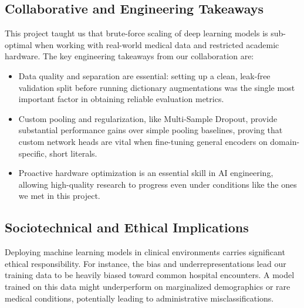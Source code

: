 \documentclass{article}
\begin{document}
\subsection{Collaborative and Engineering Takeaways}
This project taught us that brute-force scaling of deep learning models is sub-optimal when working with real-world medical data and restricted academic hardware. The key engineering takeaways from our collaboration are:
\begin{itemize}
    \item Data quality and separation are essential: setting up a clean, leak-free validation split before running dictionary augmentations was the single most important factor in obtaining reliable evaluation metrics.
    
    \item Custom pooling and regularization, like Multi-Sample Dropout, provide substantial performance gains over simple pooling baselines, proving that custom network heads are vital when fine-tuning general encoders on domain-specific, short literals.
    
    \item Proactive hardware optimization is an essential skill in  AI engineering, allowing high-quality research to progress even under conditions like the ones we met in this project.
\end{itemize}

\subsection{Sociotechnical and Ethical Implications}
Deploying machine learning models in clinical environments carries significant ethical responsibility.
For instance, the bias and underrepresentations lead our training data to be heavily biased toward common hospital encounters. A model trained on this data might underperform on marginalized demographics or rare medical conditions, potentially leading to administrative misclassifications.
\end{document}
